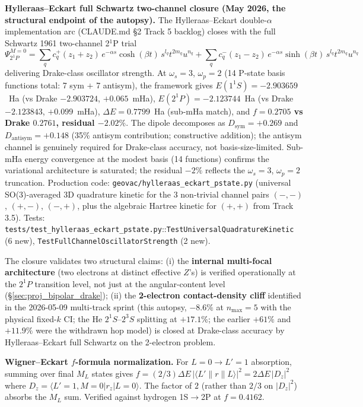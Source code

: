 \documentclass[11pt]{article}
\begin{document}
\textbf{Hylleraas--Eckart full Schwartz two-channel closure (May 2026,
the structural endpoint of the autopsy).}  The Hylleraas--Eckart double-$\alpha$
implementation arc (CLAUDE.md \S2 Track 5 backlog) closes with the full
Schwartz 1961 two-channel 2$^1$P trial
\[
\Psi_{2^1P}^{M=0} = \sum_q c_q^{+} (z_1+z_2)\,e^{-\alpha s}\cosh(\beta t)\,
                       s^{l_q} t^{2m_q} u^{n_q}
                 + \sum_q c_q^{-} (z_1-z_2)\,e^{-\alpha s}\sinh(\beta t)\,
                       s^{l_q} t^{2m_q} u^{n_q}
\]
delivering Drake-class oscillator strength.  At $\omega_s = 3$,
$\omega_p = 2$ (14 P-state basis functions total: 7 sym $+$ 7 antisym),
the framework gives $E(1^1\!S) = -2.903659$~Ha (vs Drake $-2.903724$,
$+0.065$~mHa), $E(2^1\!P) = -2.123744$~Ha (vs Drake $-2.123843$,
$+0.099$~mHa), $\Delta E = 0.7799$~Ha (sub-mHa match), and
\textbf{$f = 0.2705$ vs Drake $0.2761$, residual $\boxed{-2.02\%}$}.
The dipole decomposes as $D_\text{sym} = +0.269$ and
$D_\text{antisym} = +0.148$ (35\% antisym contribution; constructive
addition); the antisym channel is genuinely required for Drake-class
accuracy, not basis-size-limited.  Sub-mHa energy convergence at the
modest basis (14 functions) confirms the variational architecture is
saturated; the residual $-2\%$ reflects the $\omega_s = 3$, $\omega_p = 2$
truncation.  Production code: \texttt{geovac/hylleraas\_eckart\_pstate.py}
(universal SO(3)-averaged 3D quadrature kinetic for the 3 non-trivial
channel pairs $(-,-)$, $(+,-)$, $(-,+)$, plus the algebraic Hartree
kinetic for $(+,+)$ from Track 3.5).  Tests:
\texttt{tests/test\_hylleraas\_eckart\_pstate.py}::\texttt{TestUniversalQuadratureKinetic}
(6 new), \texttt{TestFullChannelOscillatorStrength} (2 new).

The closure validates two structural claims:
(i) the \textbf{internal multi-focal architecture} (two electrons at
distinct effective $Z$'s) is verified operationally at the $2^1P$
transition level, not just at the angular-content level (\S\ref{sec:proj_bipolar_drake});
(ii) the \textbf{2-electron contact-density cliff} identified in the
2026-05-09 multi-track sprint (this autopsy, $-8.6\%$ at $n_{\max}=5$
with the physical fixed-$k$ CI; the He $2^1S$--$2^3S$ splitting at
$+17.1\%$; the earlier $+61\%$ and $+11.9\%$ were the withdrawn hop
model) is closed at Drake-class
accuracy by Hylleraas--Eckart full Schwartz on the 2-electron problem.

\textbf{Wigner--Eckart $f$-formula normalization.}  For $L=0 \to L'=1$
absorption, summing over final $M_L$ states gives
$f = (2/3)\Delta E\,|\langle L'\|r\|L\rangle|^2 = 2\Delta E\,|D_z|^2$
where $D_z = \langle L'=1, M=0 | r_z | L=0\rangle$.  The factor of $2$
(rather than $2/3$ on $|D_z|^2$) absorbs the $M_L$ sum.  Verified
against hydrogen 1S$\to$2P at $f = 0.4162$.
\end{document}
